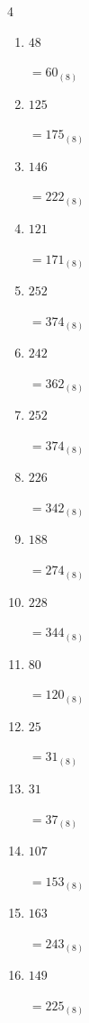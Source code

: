 \begin{multicols}{4}
\begin{enumerate}
  \item $48$

        $=60_{(8)}$

  \item $125$

        $=175_{(8)}$

  \item $146$

        $=222_{(8)}$

  \item $121$

        $=171_{(8)}$

  \item $252$

        $=374_{(8)}$

  \item $242$

        $=362_{(8)}$

  \item $252$

        $=374_{(8)}$

\columnbreak %

\resetques

  \item $226$

        $=342_{(8)}$

  \item $188$

        $=274_{(8)}$

  \item $228$

        $=344_{(8)}$

  \item $80$

        $=120_{(8)}$

  \item $25$

        $=31_{(8)}$

  \item $31$

        $=37_{(8)}$

  \item $107$

        $=153_{(8)}$

  \item $163$

        $=243_{(8)}$

  \item $149$

        $=225_{(8)}$


\end{enumerate}
\end{multicols}
